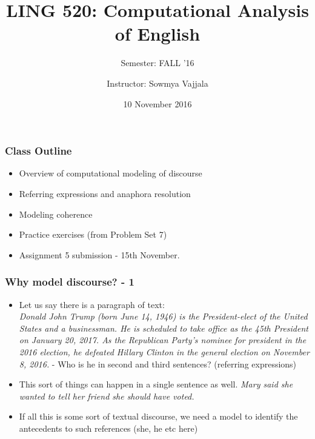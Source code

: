 \documentclass{beamer}
\author[Sowmya Vajjala]{Instructor: Sowmya Vajjala}
\title[LING 520]{LING 520: Computational Analysis of English}
\subtitle{Semester: FALL '16}
\date{10 November 2016}
\institute{Iowa State University, USA}
\begin{document}
\begin{frame}\titlepage
\end{frame}

\begin{frame}
\frametitle{Class Outline}
\begin{itemize}
\item Overview of computational modeling of discourse %
\item Referring expressions and anaphora resolution %
\item Modeling coherence
\item Practice exercises (from Problem Set 7) %
\item Assignment 5 submission - 15th November.
\end{itemize}
\end{frame}

\begin{frame}
\frametitle{Why model discourse? - 1}
\begin{itemize}
\item Let us say there is a paragraph of text: 
\\ \textit{Donald John Trump (born June 14, 1946) is the President-elect of the United States and a businessman. He is scheduled to take office as the 45th President on January 20, 2017. As the Republican Party's nominee for president in the 2016 election, he defeated Hillary Clinton in the general election on November 8, 2016.} 
- Who is he in second and third sentences? (referring expressions) \pause
\item This sort of things can happen in a single sentence as well. \textit{Mary said she wanted to tell her friend she should have voted.}
\item If all this is some sort of textual discourse, we need a model to identify the antecedents to such references (she, he etc here)
\end{itemize}
\end{frame}
\end{document}
